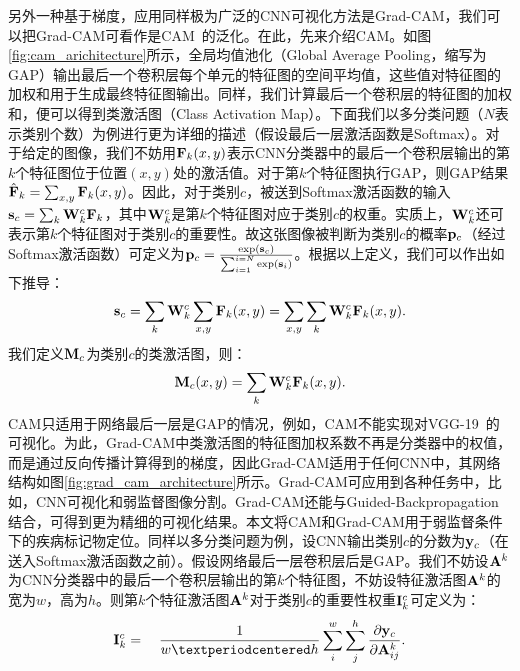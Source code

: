 另外一种基于梯度，应用同样极为广泛的CNN可视化方法是Grad-CAM，我们可以把Grad-CAM可看作是CAM~\cite{zhou2016learning}的泛化。在此，先来介绍CAM。如图\ref{fig:cam_arichitecture}所示，全局均值池化（Global Average Pooling，缩写为GAP）输出最后一个卷积层每个单元的特征图的空间平均值，这些值对特征图的加权和用于生成最终特征图输出。同样，我们计算最后一个卷积层的特征图的加权和，便可以得到类激活图（Class Activation Map）。下面我们以多分类问题（$N$表示类别个数）为例进行更为详细的描述（假设最后一层激活函数是Softmax）。对于给定的图像，我们不妨用$\mathbf{F}_k(x, y)$表示CNN分类器中的最后一个卷积层输出的第$k$个特征图位于位置$(x,y)$处的激活值。对于第$k$个特征图执行GAP，则GAP结果$\hat{\mathbf{F}}_k=\sum_{x, y} \mathbf{F}_{k}(x,y)$。因此，对于类别$c$，被送到Softmax激活函数的输入$\mathbf{s}_c=\sum_{k} \mathbf{W}_{k}^{c} \mathbf{F}_{k}$，其中$\mathbf{W}_k^c$是第$k$个特征图对应于类别$c$的权重。实质上，$\mathbf{W}_{k}^{c}$还可表示第$k$个特征图对于类别$c$的重要性。故这张图像被判断为类别$c$的概率${\mathbf{p}}_c$（经过Softmax激活函数）可定义为$\mathbf{p}_c=\frac{\exp \left(\mathbf{s}_{c}\right)}{\sum_{i=1}^{i=N} \exp \left(\mathbf{s}_{i}\right)}$。根据以上定义，我们可以作出如下推导：
\begin{equation}
\mathbf{s}_{c}=\sum_{k} \mathbf{W}_{k}^{c} \sum_{x, y} \mathbf{F}_{k}(x, y)=\sum_{x, y} \sum_{k} \mathbf{W}_{k}^{c} \mathbf{F}_{k}(x, y).
\end{equation}
我们定义$\mathbf{M}_c$为类别$c$的类激活图，则：
\begin{equation}\label{equ:cam_heatmap_compute}
\mathbf{M}_{c}(x, y)=\sum_{k} \mathbf{W}_{k}^{c} \mathbf{F}_{k}(x, y).
\end{equation}
CAM只适用于网络最后一层是GAP的情况，例如，CAM不能实现对VGG-19~\cite{simonyan2014very}的可视化。为此，Grad-CAM中类激活图的特征图加权系数不再是分类器中的权值，而是通过反向传播计算得到的梯度，因此Grad-CAM适用于任何CNN中，其网络结构如图\ref{fig:grad_cam_architecture}所示。Grad-CAM可应用到各种任务中，比如，CNN可视化和弱监督图像分割。Grad-CAM还能与Guided-Backpropagation结合，可得到更为精细的可视化结果。本文将CAM和Grad-CAM用于弱监督条件下的疾病标记物定位。同样以多分类问题为例，设CNN输出类别$c$的分数为$\mathbf{y}_c$（在送入Softmax激活函数之前）。假设网络最后一层卷积层后是GAP。我们不妨设$\mathbf{A}^{k}$为CNN分类器中的最后一个卷积层输出的第$k$个特征图，不妨设特征激活图$\mathbf{A}^{k}$的宽为$w$，高为$h$。则第$k$个特征激活图$\mathbf{A}^{k}$对于类别$c$的重要性权重$\mathbf{I}_{k}^{c}$可定义为：
\begin{equation}
\ve{I}_{k}^{c}=\quad \frac{1}{w·h} \sum_{i}^{w} \sum_{j}^{h} \frac{\partial \ve{y}_{c}}{\partial \ve{A}_{i j}^{k}}.
\end{equation}
